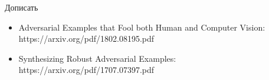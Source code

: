 \documentclass[14pt,mathserif,aspectratio=43,unicode]{beamer}
\begin{document}
\begin{frame}{Дописать}

    \begin{itemize}
    
    
        \item Adversarial Examples that Fool both Human and Computer Vision: https://arxiv.org/pdf/1802.08195.pdf
        \item Synthesizing Robust Adversarial Examples: https://arxiv.org/pdf/1707.07397.pdf

    \end{itemize}
    
\end{frame}
\end{document}
